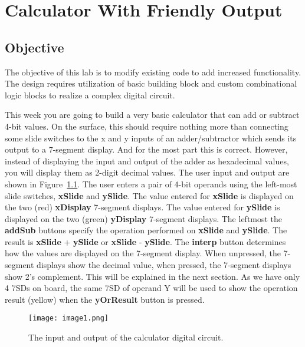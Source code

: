 \chapter{Calculator With Friendly Output}
\label{chapter:calc}
\graphicspath{ {./Lab06Calculator/Fig} }

\hypertarget{objective}{%
\section{\texorpdfstring{Objective }{Objective }}\label{objective}}

The objective of this lab is to modify existing code to add increased
functionality. The design requires utilization of basic building block
and custom combinational logic blocks to realize a complex digital
circuit.


This week you are going to build a very basic calculator that can add or
subtract 4-bit values. On the surface, this should require nothing more
than connecting some slide switches to the x and y inputs of an
adder/subtractor which sends its output to a 7-segment display. And for
the most part this is correct. However, instead of displaying the input
and output of the adder as hexadecimal values, you will display them as
2-digit decimal values. The user input and output are shown in Figure~\ref{fig:calcDevBoard}.
The user enters a pair of 4-bit operands using the left-most slide
switches, \textbf{xSlide} and \textbf{ySlide}. The value entered for
\textbf{xSlide} is displayed on the two (red) \textbf{xDisplay}
7-segment displays. The value entered for \textbf{ySlide} is displayed
on the two (green) \textbf{yDisplay} 7-segment displays. The leftmost
the \textbf{addSub} buttons specify the operation performed on
\textbf{xSlide} and \textbf{ySlide}. The result is \textbf{xSlide} +
\textbf{ySlide} or \textbf{xSlide} - \textbf{ySlide}. The
\textbf{interp} button determines how the values are displayed on the
7-segment display. When unpressed, the 7-segment displays show the
decimal value, when pressed, the 7-segment displays show 2's complement.
This will be explained in the next section. As we have only 4 7SDs on
board, the same 7SD of operand Y will be used to show the operation
result (yellow) when the \textbf{yOrResult} button is pressed.

\begin{figure}
\texttt{[image:  image1.png]}
\caption{The input and output of the calculator digital circuit.}
\label{fig:calcDevBoard}
\end{figure}

